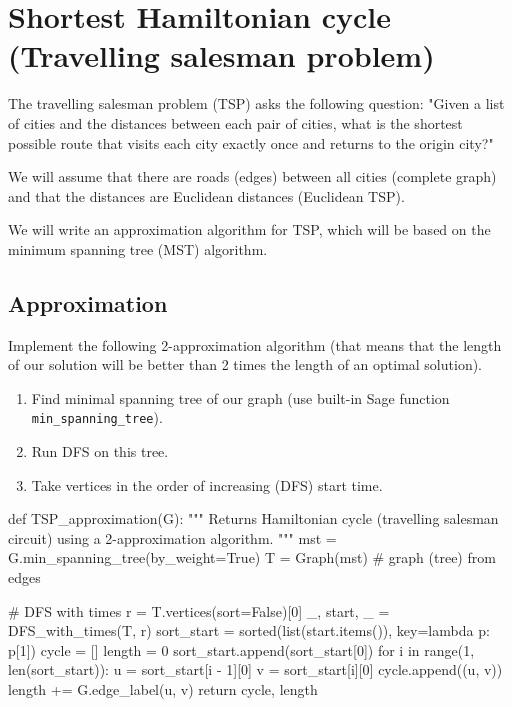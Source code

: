 \chapter{Shortest Hamiltonian cycle (Travelling salesman problem)}

The travelling salesman problem (TSP) asks the following question: "Given a list of cities and the distances between each pair of cities, what is the shortest possible route that visits each city exactly once and returns to the origin city?"

We will assume that there are roads (edges) between all cities (complete graph) and that the distances are Euclidean distances (Euclidean TSP).

We will write an approximation algorithm for TSP, which will be based on the minimum spanning tree (MST) algorithm.

\section{Approximation}

Implement the following 2-approximation algorithm (that means that the length of our solution will be better than 2 times the length of an optimal solution).
\begin{enumerate}
    \item Find minimal spanning tree of our graph (use built-in Sage function \verb`min_spanning_tree`).
    \item Run DFS on this tree.
    \item Take vertices in the order of increasing (DFS) start time.
\end{enumerate}

\medskip
\begin{sageCell}
def TSP_approximation(G):
    """
    Returns Hamiltonian cycle (travelling salesman circuit) using a 2-approximation algorithm.
    """
    mst = G.min_spanning_tree(by_weight=True)
    T = Graph(mst) # graph (tree) from edges

    # DFS with times
    r = T.vertices(sort=False)[0]
    _, start, _ = DFS_with_times(T, r)
    sort_start = sorted(list(start.items()), key=lambda p: p[1])
    cycle = []
    length = 0
    sort_start.append(sort_start[0])
    for i in range(1, len(sort_start)):
        u = sort_start[i - 1][0]
        v = sort_start[i][0]
        cycle.append((u, v))
        length += G.edge_label(u, v)
    return cycle, length
\end{sageCell}

